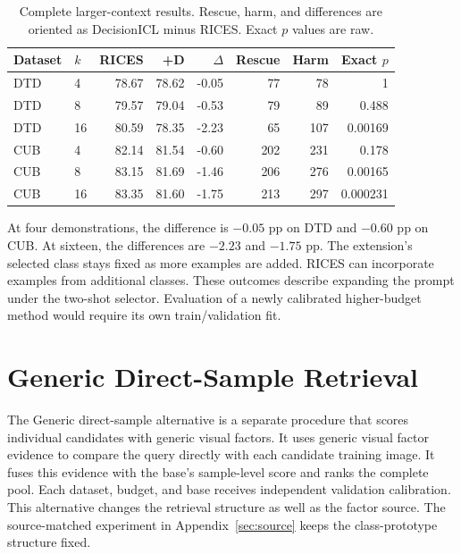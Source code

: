 \documentclass[10pt,twocolumn,letterpaper]{article}
\newcommand{\method}{DecisionICL\xspace}
\begin{document}
\begin{table}[t]
\caption{Complete larger-context results. Rescue, harm, and differences are oriented as \method minus RICES. Exact $p$ values are raw.}
\label{sup:shot_curve}
\centering\small
\begin{tabular}{llrrrrrr}
\toprule
Dataset & $k$ & RICES & +D & $\Delta$ & Rescue & Harm & Exact $p$ \\
\midrule
DTD & 4 & 78.67 & 78.62 & -0.05 & 77 & 78 & 1 \\
DTD & 8 & 79.57 & 79.04 & -0.53 & 79 & 89 & 0.488 \\
DTD & 16 & 80.59 & 78.35 & -2.23 & 65 & 107 & 0.00169 \\
CUB & 4 & 82.14 & 81.54 & -0.60 & 202 & 231 & 0.178 \\
CUB & 8 & 83.15 & 81.69 & -1.46 & 206 & 276 & 0.00165 \\
CUB & 16 & 83.35 & 81.60 & -1.75 & 213 & 297 & 0.000231 \\
\bottomrule
\end{tabular}
\end{table}

At four demonstrations, the difference is $-0.05$ pp on DTD and $-0.60$ pp on CUB. At sixteen, the differences are $-2.23$ and $-1.75$ pp. The extension's selected class stays fixed as more examples are added. RICES can incorporate examples from additional classes. These outcomes describe expanding the prompt under the two-shot selector. Evaluation of a newly calibrated higher-budget method would require its own train/validation fit.

\section{Generic Direct-Sample Retrieval}
The Generic direct-sample alternative is a separate procedure that scores individual candidates with generic visual factors. It uses generic visual factor evidence to compare the query directly with each candidate training image. It fuses this evidence with the base's sample-level score and ranks the complete pool. Each dataset, budget, and base receives independent validation calibration. This alternative changes the retrieval structure as well as the factor source. The source-matched experiment in Appendix~\ref{sec:source} keeps the class-prototype structure fixed.
\end{document}
